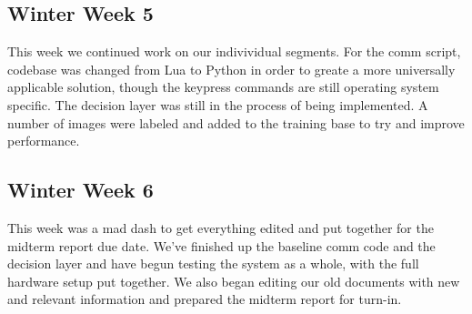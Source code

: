 \documentclass[onecolumn, draftclsnofoot,10pt, compsoc]{IEEEtran}
\begin{document}
\subsection{Winter Week 5}
This week we continued work on our indivividual segments. 
For the comm script, codebase was changed from Lua to Python in order to greate a more universally applicable solution, though the keypress commands are still operating system specific.
The decision layer was still in the process of being implemented.
A number of images were labeled and added to the training base to try and improve performance.

\subsection{Winter Week 6}
This week was a mad dash to get everything edited and put together for the midterm report due date.
We've finished up the baseline comm code and the decision layer and have begun testing the system as a whole, with the full hardware setup put together.
We also began editing our old documents with new and relevant information and prepared the midterm report for turn-in.
\end{document}
